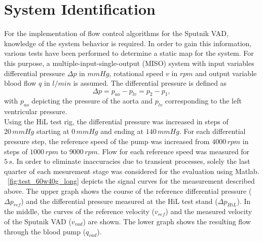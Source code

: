\section{System Identification}
For the implementation of flow control algorithms for the Sputnik VAD, knowledge of the system behavior is required. In order to gain this information, various tests have been performed to determine a static map for the system. For this purpose, a multiple-input-single-output (MISO) system with input variables differential pressure $\Delta{p}$ in $mmHg$, rotational speed $v$ in $rpm$ and output variable blood flow $q$ in $l/min$ is assumed. The differential pressure is defined as
\begin{equation}
  \Delta{p} = p_{ao} - p_{lv} = p_2 - p_1,
\end{equation}
with $p_{ao}$ depicting the pressure of the aorta and $p_{lv}$ corresponding to the left ventricular pressure.
\\Using the HiL test rig, the differential pressure was increased in steps of $20\, mmHg$ starting at $0\,mmHg$ and ending at $140\,mmHg$. For each differential pressure step, the reference speed of the pump was increased from $4000\, rpm$ in steps of $1000\, rpm$ to $9000\, rpm$. Flow for each reference speed was measured for $5\, s$. In order to eliminate inaccuracies due to transient processes, solely the last quarter of each mesurement stage was considered for the evaluation using Matlab. \figurename~\ref{fig:test_60w40g_long} depicts the signal curves for the measurement described above. The upper graph shows the course of the reference differential pressure ($\Delta{p_{ref}}$) and the differential pressure measured at the HiL test stand ($\Delta{p_{HiL}}$).
In the middle, the curves of the reference velocity ($v_{ref}$) and the measured velocity of the Sputnik VAD ($v_{vad}$) are shown. The lower graph shows the resulting flow through the blood pump ($q_{vad}$).


